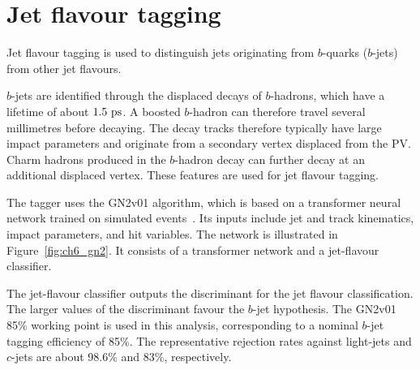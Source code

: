 \section{Jet flavour tagging}
\label{sec:ch6_btag}

Jet flavour tagging is used to distinguish jets originating from $b$-quarks ($b$-jets) from other jet flavours.

$b$-jets are identified through the displaced decays of $b$-hadrons, which have a lifetime of about $1.5~\mathrm{ps}$. A boosted $b$-hadron can therefore travel several millimetres before decaying.
The decay tracks therefore typically have large impact parameters and originate from a secondary vertex displaced from the PV.
Charm hadrons produced in the $b$-hadron decay can further decay at an additional displaced vertex.
These features are used for jet flavour tagging.

The tagger uses the GN2v01 algorithm, which is based on a transformer neural network trained on simulated events~\cite{ATLAS2026GN2}.
Its inputs include jet and track kinematics, impact parameters, and hit variables.
The network is illustrated in Figure~\ref{fig:ch6_gn2}. It consists of a transformer network and a jet-flavour classifier.

The jet-flavour classifier outputs the discriminant for the jet flavour classification. The larger values of the discriminant favour the $b$-jet hypothesis.
The GN2v01 85\% working point is used in this analysis, corresponding to a nominal $b$-jet tagging efficiency of 85\%.
The representative rejection rates against light-jets and $c$-jets are about 98.6\% and 83\%, respectively.



